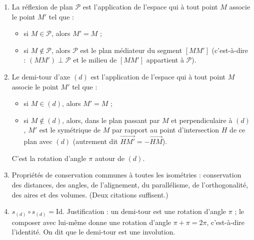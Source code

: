 \documentclass[11pt]{article}
\newcommand{\cle}[1]{{\popxbold\color{popdark}#1}}
\begin{document}
\begin{corrige}
\begin{enumerate}
\item La \cle{réflexion} de plan $\mathcal{P}$ est l'application de l'espace qui à tout point $M$ associe le point $M'$ tel que :
\begin{itemize}
\item si $M\in\mathcal{P}$, alors $M'=M$ ;
\item si $M\notin\mathcal{P}$, alors $\mathcal{P}$ est le plan médiateur du segment $[MM']$ (c'est-à-dire : $(MM')\perp\mathcal{P}$ et le milieu de $[MM']$ appartient à $\mathcal{P}$).
\end{itemize}
\item Le \cle{demi-tour} d'axe $(d)$ est l'application de l'espace qui à tout point $M$ associe le point $M'$ tel que :
\begin{itemize}
\item si $M\in(d)$, alors $M'=M$ ;
\item si $M\notin(d)$, alors, dans le plan passant par $M$ et perpendiculaire à $(d)$, $M'$ est le symétrique de $M$ par rapport au point d'intersection $H$ de ce plan avec $(d)$ (autrement dit $\overrightarrow{HM'}=-\overrightarrow{HM}$).
\end{itemize}
C'est la rotation d'angle $\pi$ autour de $(d)$.
\item Propriétés de conservation communes à toutes les isométries : conservation des \cle{distances}, des \cle{angles}, de l'\cle{alignement}, du \cle{parallélisme}, de l'\cle{orthogonalité}, des aires et des volumes. (Deux citations suffisent.)
\item $s_{(d)}\circ s_{(d)}=\mathrm{Id}$. Justification : un demi-tour est une rotation d'angle $\pi$ ; le composer avec lui-même donne une rotation d'angle $\pi+\pi=2\pi$, c'est-à-dire l'identité. On dit que le demi-tour est une \cle{involution}.
\end{enumerate}
\end{corrige}
\end{document}
